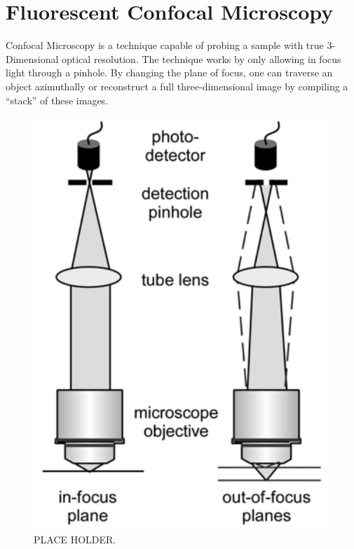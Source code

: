 
\section{Fluorescent Confocal Microscopy} \label{ch:microscopy}
Confocal Microscopy is a technique capable of probing a sample with true 3-Dimensional optical resolution. The technique works by only allowing in focus light through a pinhole. By changing the plane of focus, one can traverse an object azimuthally or reconstruct a full three-dimensional image by compiling a ``stack'' of these images.  

\begin{figure}
	
	\centering
	\vspace{-1.2em}
	\includegraphics[width=\linewidth]{confocal_stuff/confocal_orig_fi_1-1}
	\caption[Confocal Optics 1]{PLACE HOLDER.}
	\label{fig:confocal_1}
	
	
\end{figure}
	
